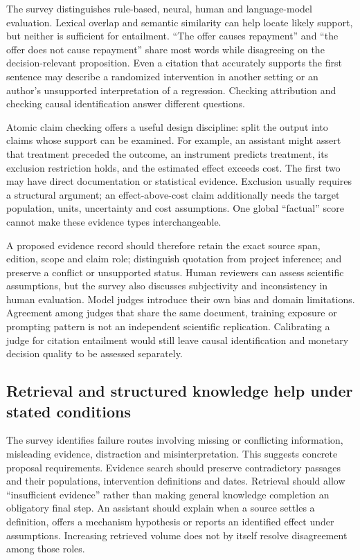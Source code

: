 The survey distinguishes rule-based, neural, human and language-model
evaluation. Lexical overlap and semantic similarity can help locate likely
support, but neither is sufficient for entailment. ``The offer causes
repayment'' and ``the offer does not cause repayment'' share most words while
disagreeing on the decision-relevant proposition. Even a citation that
accurately supports the first sentence may describe a randomized intervention
in another setting or an author's unsupported interpretation of a regression.
Checking attribution and checking causal identification answer different
questions.

Atomic claim checking offers a useful design discipline: split the output into
claims whose support can be examined. For example, an assistant might assert
that treatment preceded the outcome, an instrument predicts treatment, its
exclusion restriction holds, and the estimated effect exceeds cost. The first
two may have direct documentation or statistical evidence. Exclusion usually
requires a structural argument; an effect-above-cost claim additionally needs
the target population, units, uncertainty and cost assumptions. One global
``factual'' score cannot make these evidence types interchangeable.

A proposed evidence record should therefore retain the exact source span,
edition, scope and claim role; distinguish quotation from project inference;
and preserve a conflict or unsupported status. Human reviewers can assess
scientific assumptions, but the survey also discusses subjectivity and
inconsistency in human evaluation. Model judges introduce their own bias and
domain limitations. Agreement among judges that share the same document,
training exposure or prompting pattern is not an independent scientific
replication. Calibrating a judge for citation entailment would still leave
causal identification and monetary decision quality to be assessed separately.

\subsection{Retrieval and structured knowledge help under stated conditions}

The survey identifies failure routes involving missing or conflicting
information, misleading evidence, distraction and misinterpretation. This
suggests concrete proposal requirements. Evidence search should preserve
contradictory passages and their populations, intervention definitions and
dates. Retrieval should allow ``insufficient evidence'' rather than making
general knowledge completion an obligatory final step. An assistant should
explain when a source settles a definition, offers a mechanism hypothesis or
reports an identified effect under assumptions. Increasing retrieved volume
does not by itself resolve disagreement among those roles.

